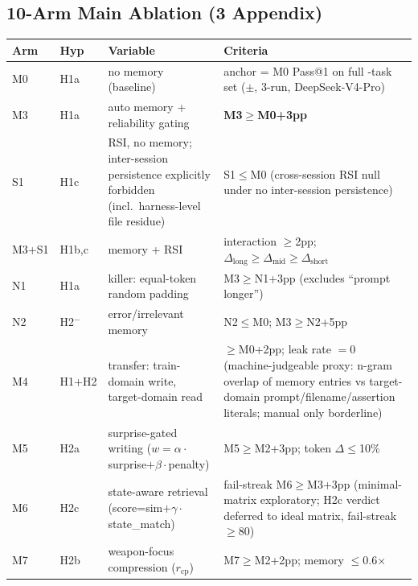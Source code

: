 \subsection{10-Arm Main Ablation (3 Appendix)}
\label{sec:arms}

\begin{center}
\scriptsize
\setlength{\tabcolsep}{2.5pt}
\begin{tabularx}{\columnwidth}{@{}llYY@{}}
\toprule
\textbf{Arm} & \textbf{Hyp} & \textbf{Variable} & \textbf{Criteria} \\
\midrule
M0 & H1a & no memory (baseline) & anchor = M0 Pass@1 on full \Ncases{}-task set (\MzeroPass{}$\pm$\MzeroStd{}, 3-run, DeepSeek-V4-Pro) \\
M3 & H1a & auto memory + reliability gating & \textbf{M3$\geq$M0+3pp} \\
S1 & H1c & RSI, no memory; inter-session persistence explicitly forbidden (incl.\ harness-level file residue) & S1$\leq$M0 (cross-session RSI null under no inter-session persistence) \\
M3+S1 & H1b,c & memory + RSI & interaction $\geq$2pp; $\Delta_{\text{long}}\geq\Delta_{\text{mid}}\geq\Delta_{\text{short}}$ \\
\midrule
N1 & H1a & killer: equal-token random padding & M3$\geq$N1+3pp (excludes ``prompt longer'') \\
N2 & H2$^-$ & error/irrelevant memory & N2$\leq$M0; M3$\geq$N2+5pp \\
M4 & H1+H2 & transfer: train-domain write, target-domain read & $\geq$M0+2pp; leak rate $=0$ (machine-judgeable proxy: n-gram overlap of memory entries vs target-domain prompt/filename/assertion literals; manual only borderline) \\
\midrule
M5 & H2a & surprise-gated writing ($w=\alpha\cdot$surprise$+\beta\cdot$penalty) & M5$\geq$M2+3pp; token $\Delta\leq$10\% \\
M6 & H2c & state-aware retrieval (score=sim$+\gamma\cdot$state\_match) & fail-streak M6$\geq$M3+3pp (minimal-matrix exploratory; H2c verdict deferred to ideal matrix, fail-streak $\geq$80) \\
M7 & H2b & weapon-focus compression ($r_{\text{cp}}$) & M7$\geq$M2+2pp; memory $\leq$0.6$\times$ \\
\bottomrule
\end{tabularx}
\end{center}

